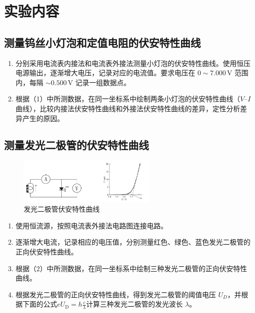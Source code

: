 \documentclass[12pt,a4paper]{article}
\begin{document}
	\section{实验内容}
		\subsection{测量钨丝小灯泡和定值电阻的伏安特性曲线}
			\begin{enumerate}[label=\arabic*.]
			\item 分别采用电流表内接法和电流表外接法测量小灯泡的伏安特性曲线。使用恒压电源输出，逐渐增大电压，记录对应的电流值。要求电压在 \(0\sim7.000\,\text{V}\) 范围内，每隔 \(\sim0.500\,\text{V}\) 记录一组数据点。
			\item 根据（1）中所测数据，在同一坐标系中绘制两条小灯泡的伏安特性曲线（\(V\text{--}I\) 曲线），比较内接法伏安特性曲线和外接法伏安特性曲线的差异，定性分析差异产生的原因。
		\end{enumerate}

		\subsection{测量发光二极管的伏安特性曲线}
			\begin{figure}[htbp]
				\centering
				\includegraphics[width=0.6\textwidth]{发光二极管.png} %
				\caption{发光二极管伏安特性曲线}
				\label{fig:example}
	  		\end{figure}
			\begin{enumerate}[label=\arabic*]
				\item 使用恒流源，按照电流表外接法电路图连接电路。
				\item 逐渐增大电流，记录相应的电压值，分别测量红色、绿色、蓝色发光二极管的正向伏安特性曲线。
				\item 根据（2）中所测数据，在同一坐标系中绘制三种发光二极管的正向伏安特性曲线。
				\item 根据发光二极管的正向伏安特性曲线，得到发光二极管的阈值电压 \(U_D\)，并根据下面的公式$eU_\mathrm{D}{=}h\frac{c}{\lambda}$计算三种发光二极管的发光波长 \(\lambda\)。
			\end{enumerate}
\end{document}
